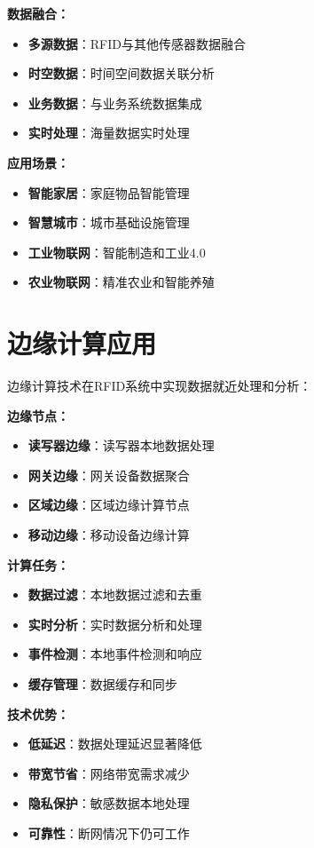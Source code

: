 \documentclass[12pt,UTF8]{ctexbook}
\begin{document}
\begin{itemize}[leftmargin=3.5em]
\begin{itemize}[leftmargin=3.5em]
\begin{itemize}[leftmargin=3.5em]
\begin{itemize}[leftmargin=3.5em]
\textbf{数据融合：}
\begin{itemize}[leftmargin=3.5em]
    \item \textbf{多源数据}：RFID与其他传感器数据融合
    \item \textbf{时空数据}：时间空间数据关联分析
    \item \textbf{业务数据}：与业务系统数据集成
    \item \textbf{实时处理}：海量数据实时处理
\end{itemize}

\textbf{应用场景：}
\begin{itemize}[leftmargin=3.5em]
    \item \textbf{智能家居}：家庭物品智能管理
    \item \textbf{智慧城市}：城市基础设施管理
    \item \textbf{工业物联网}：智能制造和工业4.0
    \item \textbf{农业物联网}：精准农业和智能养殖
\end{itemize}

\section{边缘计算应用}

边缘计算技术在RFID系统中实现数据就近处理和分析：

\textbf{边缘节点：}
\begin{itemize}[leftmargin=3.5em]
    \item \textbf{读写器边缘}：读写器本地数据处理
    \item \textbf{网关边缘}：网关设备数据聚合
    \item \textbf{区域边缘}：区域边缘计算节点
    \item \textbf{移动边缘}：移动设备边缘计算
\end{itemize}

\textbf{计算任务：}
\begin{itemize}[leftmargin=3.5em]
    \item \textbf{数据过滤}：本地数据过滤和去重
    \item \textbf{实时分析}：实时数据分析和处理
    \item \textbf{事件检测}：本地事件检测和响应
    \item \textbf{缓存管理}：数据缓存和同步
\end{itemize}

\textbf{技术优势：}
\begin{itemize}[leftmargin=3.5em]
    \item \textbf{低延迟}：数据处理延迟显著降低
    \item \textbf{带宽节省}：网络带宽需求减少
    \item \textbf{隐私保护}：敏感数据本地处理
    \item \textbf{可靠性}：断网情况下仍可工作
\end{itemize}


\end{itemize}
\end{itemize}
\end{itemize}
\end{itemize}
\end{document}
